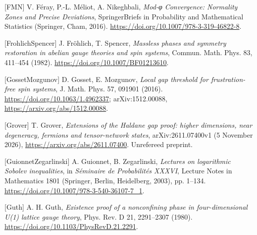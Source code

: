 \documentclass[10pt,letterpaper,twocolumn]{article}
\begin{document}
{[}FMN{]} V. Féray, P.-L. Méliot, A. Nikeghbali, \emph{Mod-φ Convergence: Normality Zones and Precise Deviations}, SpringerBriefs in Probability and Mathematical Statistics (Springer, Cham, 2016). \href{https://doi.org/10.1007/978-3-319-46822-8}{https:\allowbreak{}/\allowbreak{}/\allowbreak{}doi.\allowbreak{}org/\allowbreak{}10.\allowbreak{}1007/\allowbreak{}978-\allowbreak{}3-\allowbreak{}319-\allowbreak{}46822-\allowbreak{}8}.

{[}FrohlichSpencer{]} J. Fröhlich, T. Spencer, \emph{Massless phases and symmetry restoration in abelian gauge theories and spin systems}, Commun. Math. Phys. 83, 411--454 (1982). \href{https://doi.org/10.1007/BF01213610}{https:\allowbreak{}/\allowbreak{}/\allowbreak{}doi.\allowbreak{}org/\allowbreak{}10.\allowbreak{}1007/\allowbreak{}BF012136\allowbreak{}10}.

{[}GossetMozgunov{]} D. Gosset, E. Mozgunov, \emph{Local gap threshold for frustration-free spin systems}, J. Math. Phys. 57, 091901 (2016). \href{https://doi.org/10.1063/1.4962337}{https:\allowbreak{}/\allowbreak{}/\allowbreak{}doi.\allowbreak{}org/\allowbreak{}10.\allowbreak{}1063/\allowbreak{}1.\allowbreak{}4962337}; arXiv:1512.00088, \href{https://arxiv.org/abs/1512.00088}{https:\allowbreak{}/\allowbreak{}/\allowbreak{}arxiv.\allowbreak{}org/\allowbreak{}abs/\allowbreak{}1512.\allowbreak{}00088}.

{[}Grover{]} T. Grover, \emph{Extensions of the Haldane gap proof: higher dimensions, near degeneracy, fermions and tensor-network states}, arXiv:2611.07400v1 (5 November 2026), \href{https://arxiv.org/abs/2611.07400}{https:\allowbreak{}/\allowbreak{}/\allowbreak{}arxiv.\allowbreak{}org/\allowbreak{}abs/\allowbreak{}2611.\allowbreak{}07400}. Unrefereed preprint.

{[}GuionnetZegarlinski{]} A. Guionnet, B. Zegarlinski, \emph{Lectures on logarithmic Sobolev inequalities}, in \emph{Séminaire de Probabilités XXXVI}, Lecture Notes in Mathematics 1801 (Springer, Berlin, Heidelberg, 2003), pp. 1--134. \href{https://doi.org/10.1007/978-3-540-36107-7_1}{https:\allowbreak{}/\allowbreak{}/\allowbreak{}doi.\allowbreak{}org/\allowbreak{}10.\allowbreak{}1007/\allowbreak{}978-\allowbreak{}3-\allowbreak{}540-\allowbreak{}36107-\allowbreak{}7\_\allowbreak{}1}.

{[}Guth{]} A. H. Guth, \emph{Existence proof of a nonconfining phase in four-dimensional U(1) lattice gauge theory}, Phys. Rev. D 21, 2291--2307 (1980). \href{https://doi.org/10.1103/PhysRevD.21.2291}{https:\allowbreak{}/\allowbreak{}/\allowbreak{}doi.\allowbreak{}org/\allowbreak{}10.\allowbreak{}1103/\allowbreak{}PhysRevD\allowbreak{}.\allowbreak{}21.\allowbreak{}2291}.
\end{document}

